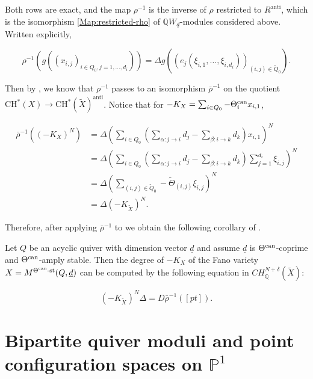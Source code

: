 \documentclass[11pt]{article}
\begin{document}
Both rows are exact, and the map \(\rho^{-1}\) is the inverse of \(\rho\) restricted to \(R^{\text{anti}}\), which is the isomorphism \ref{Map:restricted-rho} of \(\mathbb{Q}W_{\underline{d}}\)-modules considered above. Written explicitly,

\begin{equation}
    \rho^{-1}(g((x_{i,j})_{i\in Q_0, j = 1, \dots, d_i})) = \Delta g((e_j(\xi_{i, 1}, \dots, \xi_{i, d_i}))_{(i, j)\in \tilde{Q}_0}).
    \label{Equation:rho-bar-inv-def}
\end{equation}

Then by \cite[Lemma 25]{franzen2015chow}, we know that \(\rho^{-1}\) passes to an isomorphism \(\bar{\rho}^{-1}\) on the quotient \(\mathrm{CH}^*(X)\rightarrow \mathrm{CH}^*(\tilde{X})^{\text{anti}}\). Notice that for \(-K_X = \sum_{i\in Q_0}-\Theta^{\text{can}}_ix_{i, 1}\), 

\begin{align*}
    \bar{\rho}^{-1}((-K_X)^N) &= \Delta \left( \sum_{i\in Q_0}\left(\sum_{\alpha:j\rightarrow i}d_j - \sum_{\beta:i\rightarrow k}d_k\right)x_{i, 1} \right)^N\\ 
    &= \Delta \left(\sum_{i\in Q_0}\left(\sum_{\alpha:j\rightarrow i}d_j - \sum_{\beta:i\rightarrow k}d_k\right)\sum_{j = 1}^{d_i}\xi_{i,j}\right)^N\\ 
    &= \Delta \left( \sum_{(i,j)\in \tilde{Q}_0}-\tilde{\Theta}_{(i,j)}\xi_{i,j} \right)^N\\
    &= \Delta (-K_{\tilde{X}})^N.
\end{align*}

Therefore, after applying \(\bar{\rho}^{-1}\) to  we obtain the following corollary of \cite[Lemma 25]{franzen2015chow}.

\begin{corollary}
    \label{Corollary:toric-red-degree}
    Let \(Q\) be an acyclic quiver with dimension vector \(\underline{d}\) and assume \(\underline{d}\) is \(\Theta^{\text{can}}\)-coprime and \(\Theta^{\text{can}}\)-amply stable. Then the degree of \(-K_X\) of the Fano variety \(X = M^{\Theta^{\text{can}}\text{-st}}(Q, \underline{d})\) can be computed by the following equation in \(\displaystyle CH^{N + \delta}_{\mathbb{Q}}(\tilde{X})\):

    \[
    (-K_{\tilde{X}})^N\Delta = D\bar{\rho}^{-1}([pt]).
    \]
\end{corollary}

\section{Bipartite quiver moduli and point configuration spaces on \texorpdfstring{\(\mathbb{P}^1\)}{P1}}\label{Section:4}
\end{document}
